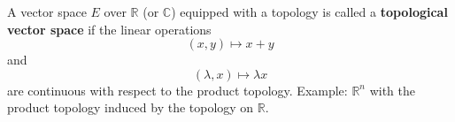 A vector space $E$ over $\mathbb{R}$ (or $\mathbb{C}$) equipped with a topology is called a \textbf{topological vector space} if the linear operations
$$(x, y) \mapsto x + y$$
and
$$(\lambda, x) \mapsto \lambda x$$
are continuous with respect to the product topology. Example: $\mathbb{R}^n$ with the product topology induced by the topology on $\mathbb{R}$.
